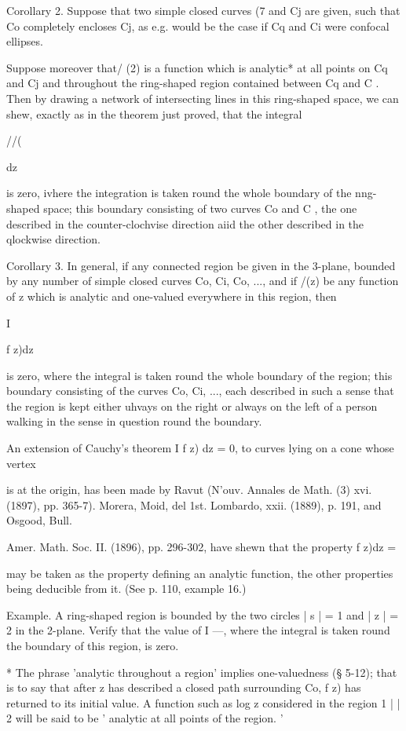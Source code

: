{Corollary 2. Suppose that two simple closed curves (7 and Cj are
given, such that Co completely encloses Cj, as e.g. would be the case
if Cq and Ci were confocal ellipses.

Suppose moreover that/ (2) is a function which is analytic* at all
points on Cq and Cj and throughout the ring-shaped region contained
between Cq and C . Then by drawing a network of intersecting lines in
this ring-shaped space, we can shew, exactly as in the theorem just
proved, that the integral

//(

dz

is zero, ivhere the integration is taken round the whole boundary of
the nng-shaped space; this boundary consisting of two curves Co and C
, the one described in the counter-clochvise direction aiid the other
described in the qlockwise direction.

Corollary 3. In general, if any connected region be given in the
3-plane, bounded by any number of simple closed curves Co, Ci, Co,
..., and if /(z) be any function of z which is analytic and one-valued
everywhere in this region, then

I

f z)dz

is zero, where the integral is taken round the whole boundary of the
region; this boundary consisting of the curves Co, Ci, ..., each
described in such a sense that the region is kept either uhvays on the
right or always on the left of a person walking in the sense in
question round the boundary.

An extension of Cauchy's theorem I f z) dz = 0, to curves lying on a
cone whose vertex

is at the origin, has been made by Ravut (N'ouv. Annales de Math. (3)
xvi. (1897), pp. 365-7). Morera, Moid, del 1st. Lombardo, xxii.
(1889), p. 191, and Osgood, Bull.

Amer. Math. Soc. II. (1896), pp. 296-302, have shewn that the property
f z)dz =

may be taken as the property defining an analytic function, the other
properties being deducible from it. (See p. 110, example 16.)

Example. A ring-shaped region is bounded by the two circles | s | = 1
and | z | = 2 in the 2-plane. Verify that the value of I —, where the
integral is taken round the boundary of this region, is zero.

* The phrase 'analytic throughout a region' implies one-valuedness (§
5-12); that is to say that after z has described a closed path
surrounding Co, f z) has returned to its initial value. A function
such as log z considered in the region 1 | | 2 will be said to be '
analytic at all points of the region. '

}

